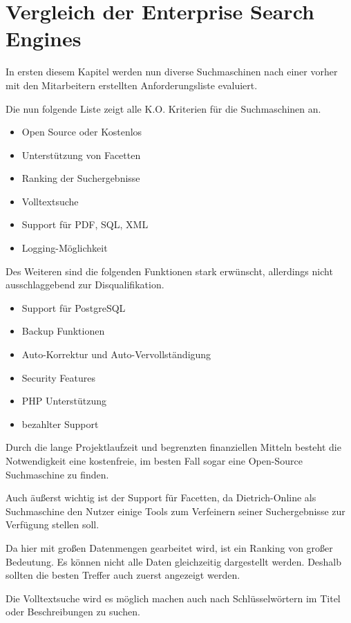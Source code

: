 \chapter{Vergleich der Enterprise Search Engines}

In ersten diesem Kapitel werden nun diverse Suchmaschinen nach einer vorher mit den Mitarbeitern erstellten Anforderungsliste evaluiert.

Die nun folgende Liste zeigt alle K.O. Kriterien für die Suchmaschinen an.
\begin{itemize}
    \item Open Source oder Kostenlos
    \item Unterstützung von Facetten
    \item Ranking der Suchergebnisse
    \item Volltextsuche
    \item Support für PDF, SQL, XML
    \item Logging-Möglichkeit
\end{itemize}

Des Weiteren sind die folgenden Funktionen stark erwünscht, allerdings nicht ausschlaggebend zur Disqualifikation.

\begin{itemize}
    \item Support für PostgreSQL
    \item Backup Funktionen
    \item Auto-Korrektur und Auto-Vervollständigung
    \item Security Features
    \item PHP Unterstützung
    \item bezahlter Support
\end{itemize}

Durch die lange Projektlaufzeit und begrenzten finanziellen Mitteln besteht die Notwendigkeit eine kostenfreie, im besten Fall sogar eine Open-Source Suchmaschine zu finden. 

Auch äußerst wichtig ist der Support für Facetten, da Dietrich-Online als Suchmaschine den Nutzer einige Tools zum Verfeinern seiner Suchergebnisse zur Verfügung stellen soll.

Da hier mit großen Datenmengen gearbeitet wird, ist ein Ranking von großer Bedeutung. Es können nicht alle Daten gleichzeitig dargestellt werden. Deshalb sollten die besten Treffer auch zuerst angezeigt werden.

Die Volltextsuche wird es möglich machen auch nach Schlüsselwörtern im Titel oder Beschreibungen zu suchen.

